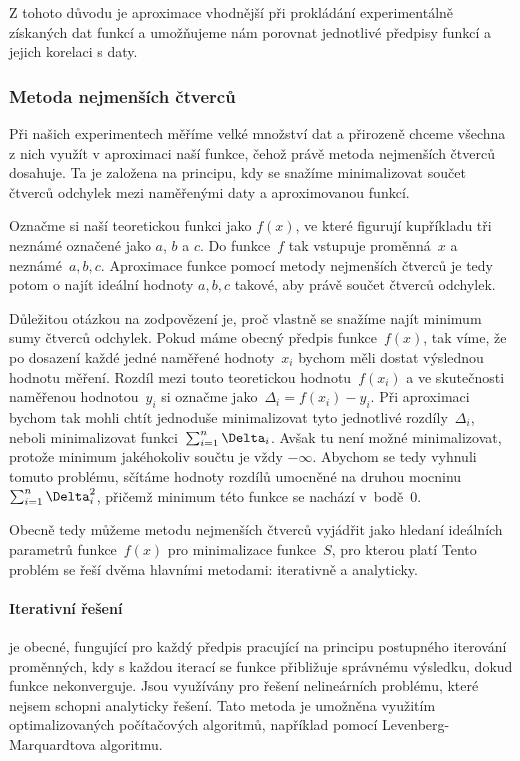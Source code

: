 Z tohoto důvodu je aproximace vhodnější při prokládání experimentálně získaných
dat funkcí a umožňujeme nám porovnat jednotlivé předpisy funkcí a jejich
korelaci s daty.

\subsubsection{Metoda nejmenších čtverců}
\label{sec:čtverce}
Při našich experimentech měříme velké množství dat a přirozeně chceme všechna
z nich využít v aproximaci naší funkce, čehož právě metoda nejmenších čtverců
dosahuje. Ta je založena na principu, kdy se snažíme minimalizovat součet
čtverců odchylek mezi naměřenými daty a aproximovanou funkcí.

Označme si naší teoretickou funkci jako $f(x)$, ve které figurují kupříkladu
tři neznámé označené jako $a$, $b$ a $c$. Do funkce~$f$ tak vstupuje
proměnná~$x$ a neznámé~$a,b,c$. Aproximace funkce pomocí metody nejmenších
čtverců je tedy potom o najít ideální hodnoty $a,b,c$ takové, aby právě součet
čtverců odchylek.

Důležitou otázkou na zodpovězení je, proč vlastně se snažíme najít minimum sumy
čtverců odchylek. Pokud máme obecný předpis funkce~$f(x)$, tak víme, že po
dosazení každé jedné naměřené hodnoty~$x_i$ bychom měli dostat výslednou
hodnotu měření. Rozdíl mezi touto teoretickou hodnotu~$f(x_i)$ a ve skutečnosti
naměřenou hodnotou~$y_i$ si označme jako~$\Delta_i = f(x_i)-y_i$. Při
aproximaci bychom tak mohli chtít jednoduše minimalizovat tyto jednotlivé
rozdíly~$\Delta_i$, neboli minimalizovat funkci~$\nsum \Delta_i$. Avšak tu není
možné minimalizovat, protože minimum jakéhokoliv součtu je vždy $-\infty$.
Abychom se tedy vyhnuli tomuto problému, sčítáme hodnoty rozdílů umocněné na
druhou mocninu~$\nsum \Delta_i^2$, přičemž minimum této funkce se nachází
v~bodě~$0$.

Obecně tedy můžeme metodu nejmenších čtverců vyjádřit jako hledaní ideálních 
parametrů funkce~$f(x)$ pro minimalizace funkce~$S$, pro kterou platí
Tento problém se řeší dvěma hlavními metodami: iterativně a analyticky.

\paragraph{Iterativní řešení} je obecné, fungující pro každý předpis pracující
na principu postupného iterování proměnných, kdy s každou iterací se funkce
přibližuje správnému výsledku, dokud funkce nekonverguje. Jsou využívány pro
řešení nelineárních problému, které nejsem schopni analyticky řešení. Tato
metoda je umožněna využitím optimalizovaných počítačových algoritmů, například
pomocí Levenberg-Marquardtova algoritmu.

